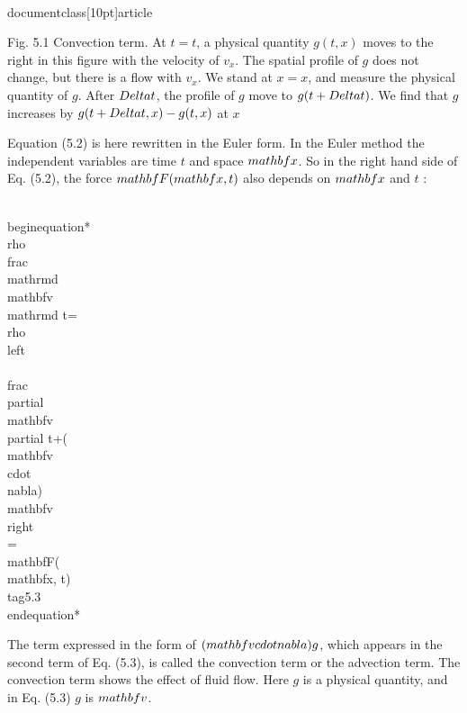 \\documentclass[10pt]{article}
\begin{document}
Fig. 5.1 Convection term. At $t=t$, a physical quantity $g(t, x)$ moves to the right in this figure with the velocity of $v_{x}$. The spatial profile of $g$ does not change, but there is a flow with $v_{x}$. We stand at $x=x$, and measure the physical quantity of $g$. After $\\Delta t$, the profile of $g$ move to $g(t+\\Delta t)$. We find that $g$ increases by $g(t+\\Delta t, x)-g(t, x)$ at $x$

Equation (5.2) is here rewritten in the Euler form. In the Euler method the independent variables are time $t$ and space $\\mathbf{x}$. So in the right hand side of Eq. (5.2), the force $\\mathbf{F}(\\mathbf{x}, t)$ also depends on $\\mathbf{x}$ and $t$ :


\\begin{equation*}
\\rho \\frac{\\mathrm{d} \\mathbf{v}}{\\mathrm{d} t}=\\rho\\left\\{\\frac{\\partial \\mathbf{v}}{\\partial t}+(\\mathbf{v} \\cdot \\nabla) \\mathbf{v}\\right\\}=\\mathbf{F}(\\mathbf{x}, t) \\tag{5.3}
\\end{equation*}


The term expressed in the form of $(\\mathbf{v} \\cdot \\nabla) g$, which appears in the second term of Eq. (5.3), is called the convection term or the advection term. The convection term shows the effect of fluid flow. Here $g$ is a physical quantity, and in Eq. (5.3) $g$ is $\\mathbf{v}$.
\end{document}
